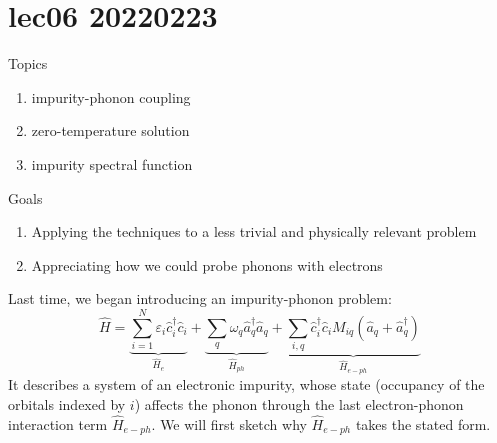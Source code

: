\chapter{lec06 20220223}

Topics

\begin{enumerate}
    \item impurity-phonon coupling
    \item zero-temperature solution
    \item impurity spectral function
\end{enumerate}

Goals

\begin{enumerate}
    \item Applying the techniques to a less trivial and physically relevant problem
    \item Appreciating how we could probe phonons with electrons
\end{enumerate}

Last time, we began introducing an impurity-phonon problem:
\[ \hat{H}=\underset{\hat{H}_e}{\underbrace{\sum_{i=1}^N{\varepsilon _i\hat{c}_{i}^{\dagger}\hat{c}_i}}}+\underset{\hat{H}_{ph}}{\underbrace{\sum_q{\omega _q\hat{a}_{q}^{\dagger}\hat{a}_q}}}+\underset{\hat{H}_{e-ph}}{\underbrace{\sum_{i,q}{\hat{c}_{i}^{\dagger}\hat{c}_iM_{iq}\left( \hat{a}_q+\hat{a}_{q}^{\dagger} \right)}}}\]
It describes a system of an electronic impurity, whose state (occupancy of the orbitals indexed by $i$) affects the phonon through the last electron-phonon interaction term $\hat{H}_{e-ph}$. We will first sketch why $\hat{H}_{e-ph}$ takes the stated form.

